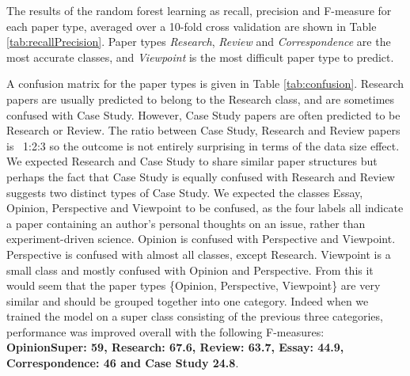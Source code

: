 \documentclass{svmult}
\begin{document}
The results of the random forest learning as recall, precision and F-measure
for each paper type, averaged over a 10-fold cross validation are shown in Table
\ref{tab:recallPrecision}. Paper types {\em Research}, {\em Review} and {\em
Correspondence} are the most accurate classes, and {\em Viewpoint} is the most
difficult paper type to predict. 


A confusion matrix for the paper types is given in Table
\ref{tab:confusion}. Research papers are usually predicted to belong
to the Research class, and are sometimes confused with Case
Study. However, Case Study papers are often predicted to be Research
or Review. The ratio between Case Study, Research and Review papers is
~1:2:3 so the outcome is not entirely surprising in terms of the data
size effect. We expected Research and Case Study to share similar
paper structures but perhaps the fact that Case Study is equally
confused with Research and Review suggests two distinct types of Case
Study.  We expected the classes Essay, Opinion, Perspective and
Viewpoint to be confused, as the four labels all indicate a paper
containing an author's personal thoughts on an issue, rather than
experiment-driven science. Opinion is confused with Perspective and
Viewpoint. Perspective is confused with almost all classes, except
Research. Viewpoint is a small class and mostly confused with Opinion
and Perspective. From this it would seem that the paper types
\{Opinion, Perspective, Viewpoint\} are very similar and should be
grouped together into one category. Indeed when we trained the model
on a super class consisting of the previous three categories,
performance was improved overall with the following F-measures:\\
{\bf OpinionSuper: 59, Research: 67.6, Review: 63.7, Essay: 44.9,
Correspondence: 46 and Case Study 24.8}.
\end{document}
